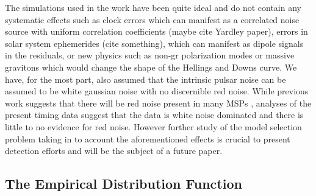 \documentclass[iop]{emulateapj}
\begin{document}

The simulations used in the work have been quite ideal and do not contain any systematic effects such as clock errors which can manifest as a correlated noise source with uniform correlation coefficients (maybe cite Yardley paper), errors in solar system ephemerides (cite something), which can manifest as dipole signals in the residuals, or new physics such as non-gr polarization modes \citep{ljp08,ss12} or massive gravitons \citep{ljp+10} which would change the shape of the Hellings and Downs curve. We have, for the most part, also assumed that the intrinsic pulsar noise can be assumed to be white gaussian noise with no discernible red noise. While previous work suggests that there will be red noise present in many MSPs \citep{sc10}, analyses of the present timing data \citep{vhj+11,delphine,esd+12} suggest that the data is white noise dominated and there is little to no evidence for red noise. However further study of the model selection problem taking in to account the aforementioned effects is crucial to present detection efforts and will be the subject of a future paper.

\subsection{The Empirical Distribution Function}
\label{sec:edf}
\end{document}

